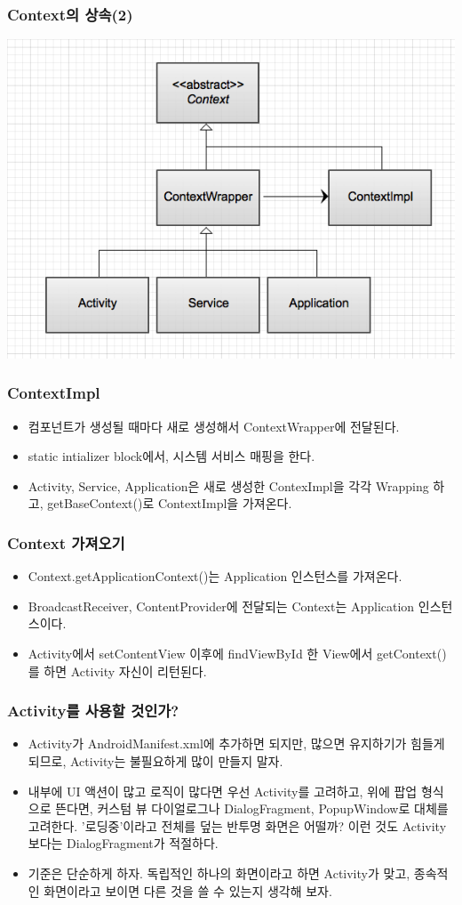 \documentclass{beamer}
\begin{document}
\begin{frame}
\frametitle{Context의 상속(2)}
\includegraphics[scale=0.3]{context}
\end{frame}

\begin{frame}
\frametitle{ContextImpl}
\begin{itemize}
\item 컴포넌트가 생성될 때마다 새로 생성해서 ContextWrapper에 전달된다.
\item static intializer block에서, 시스템 서비스 매핑을 한다.
\item Activity, Service, Application은 새로 생성한 ContexImpl을 각각 Wrapping 하고, getBaseContext()로 ContextImpl을 가져온다.
\end{itemize}
\end{frame}

\begin{frame}
\frametitle{Context 가져오기}
\begin{itemize}
\item Context.getApplicationContext()는 Application 인스턴스를 가져온다. 
\item BroadcastReceiver, ContentProvider에 전달되는 Context는 Application 인스턴스이다.
\item Activity에서 setContentView 이후에 findViewById 한 View에서 getContext()를 하면 Activity 자신이 리턴된다.
\end{itemize}
\end{frame}

\begin{frame}
\frametitle{Activity를 사용할 것인가?}
\begin{itemize}
\item Activity가 AndroidManifest.xml에 추가하면 되지만, 많으면 유지하기가 힘들게 되므로, Activity는 불필요하게 많이 만들지 말자.
\item 내부에 UI 액션이 많고 로직이 많다면 우선 Activity를 고려하고, 
위에 팝업 형식으로 뜬다면, 커스텀 뷰 다이얼로그나 DialogFragment, PopupWindow로 대체를 고려한다.
'로딩중'이라고 전체를 덮는 반투명 화면은 어떨까? 이런 것도 Activity보다는 DialogFragment가 적절하다.
\item 기준은 단순하게 하자. 독립적인 하나의 화면이라고 하면 Activity가 맞고, 종속적인 화면이라고 보이면 다른 것을 쓸 수 있는지 생각해 보자.
\end{itemize}
\end{frame}
\end{document}
